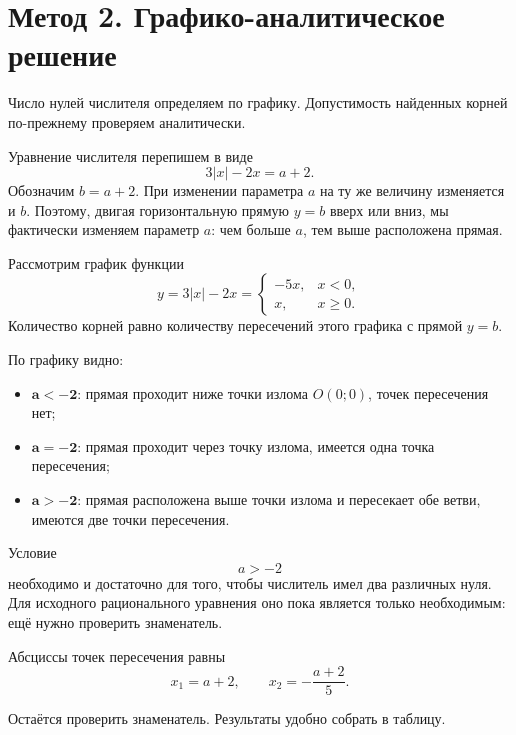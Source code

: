 \section{Метод 2. Графико-аналитическое решение}

\begin{methodintro}
  Число нулей числителя определяем по графику. Допустимость найденных
  корней по-прежнему проверяем аналитически.
\end{methodintro}

Уравнение числителя перепишем в виде
\[
  3|x|-2x=a+2.
\]
Обозначим \(b=a+2\). При изменении параметра \(a\) на ту же величину
изменяется и \(b\). Поэтому, двигая горизонтальную прямую \(y=b\) вверх
или вниз, мы фактически изменяем параметр \(a\): чем больше \(a\), тем
выше расположена прямая.

Рассмотрим график функции
\[
  y=3|x|-2x=
  \begin{cases}
    -5x, & x<0,\\
    x, & x\ge 0.
  \end{cases}
\]
Количество корней равно количеству пересечений этого графика с прямой \(y=b\).

\parametergraphfigure

По графику видно:
\begin{itemize}
  \item \(\boldsymbol{a<-2}\): прямая проходит ниже точки излома
    \(O(0;0)\), точек пересечения нет;
  \item \(\boldsymbol{a=-2}\): прямая проходит через точку излома,
    имеется одна точка пересечения;
  \item \(\boldsymbol{a>-2}\): прямая расположена выше точки излома и
    пересекает обе ветви, имеются две точки пересечения.
\end{itemize}

\begin{conclusionbox}
  Условие
  \[
    \boxed{a>-2}
  \]
  необходимо и достаточно для того, чтобы числитель имел два различных
  нуля. Для исходного рационального уравнения оно пока является только
  необходимым: ещё нужно проверить знаменатель.

  Абсциссы точек пересечения равны
  \[
    x_1=a+2,
    \qquad
    x_2=-\frac{a+2}{5}.
  \]
\end{conclusionbox}

Остаётся проверить знаменатель. Результаты удобно собрать в таблицу.

